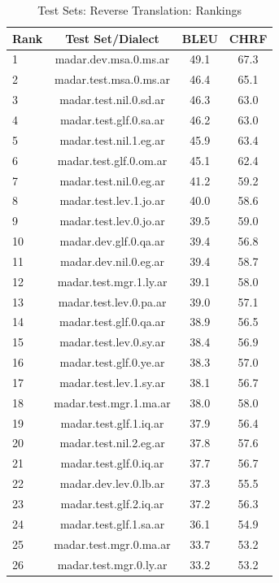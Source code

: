 \begin{table}[htbp]
\centering
\caption{Test Sets: Reverse Translation: Rankings}
\label{tab:testset_ranking_reverse}
\begin{tabular}{l@{\hspace{3pt}}c@{\hspace{3pt}}c@{\hspace{3pt}}c}
\toprule
Rank & Test Set/Dialect & BLEU & CHRF \\
\midrule
1 & madar.dev.msa.0.ms.ar & 49.1 & 67.3 \\
2 & madar.test.msa.0.ms.ar & 46.4 & 65.1 \\
3 & madar.test.nil.0.sd.ar & 46.3 & 63.0 \\
4 & madar.test.glf.0.sa.ar & 46.2 & 63.0 \\
5 & madar.test.nil.1.eg.ar & 45.9 & 63.4 \\
6 & madar.test.glf.0.om.ar & 45.1 & 62.4 \\
7 & madar.test.nil.0.eg.ar & 41.2 & 59.2 \\
8 & madar.test.lev.1.jo.ar & 40.0 & 58.6 \\
9 & madar.test.lev.0.jo.ar & 39.5 & 59.0 \\
10 & madar.dev.glf.0.qa.ar & 39.4 & 56.8 \\
11 & madar.dev.nil.0.eg.ar & 39.4 & 58.7 \\
12 & madar.test.mgr.1.ly.ar & 39.1 & 58.0 \\
13 & madar.test.lev.0.pa.ar & 39.0 & 57.1 \\
14 & madar.test.glf.0.qa.ar & 38.9 & 56.5 \\
15 & madar.test.lev.0.sy.ar & 38.4 & 56.9 \\
16 & madar.test.glf.0.ye.ar & 38.3 & 57.0 \\
17 & madar.test.lev.1.sy.ar & 38.1 & 56.7 \\
18 & madar.test.mgr.1.ma.ar & 38.0 & 58.0 \\
19 & madar.test.glf.1.iq.ar & 37.9 & 56.4 \\
20 & madar.test.nil.2.eg.ar & 37.8 & 57.6 \\
21 & madar.test.glf.0.iq.ar & 37.7 & 56.7 \\
22 & madar.dev.lev.0.lb.ar & 37.3 & 55.5 \\
23 & madar.test.glf.2.iq.ar & 37.2 & 56.3 \\
24 & madar.test.glf.1.sa.ar & 36.1 & 54.9 \\
25 & madar.test.mgr.0.ma.ar & 33.7 & 53.2 \\
26 & madar.test.mgr.0.ly.ar & 33.2 & 53.2 \\

\end{tabular}
\end{table}

